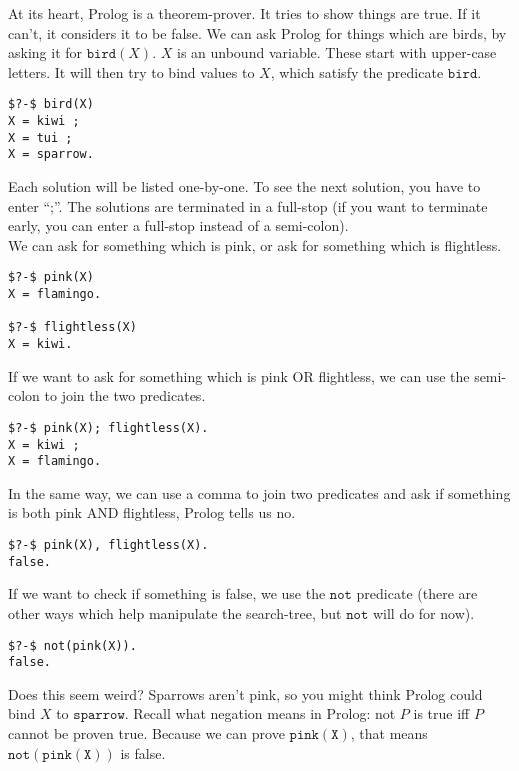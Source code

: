 \documentclass[a4paper,12pt]{article}
\newcommand{\kwa}[1]{\mathtt{#1}}
\begin{document}
\noindent
At its heart, Prolog is a theorem-prover. It tries to show things are true. If it can't, it considers it to be false. We can ask Prolog for things which are birds, by asking it for $\kwa{bird}(X)$. $X$ is an unbound variable. These start with upper-case letters. It will then try to bind values to $X$, which satisfy the predicate $\kwa{bird}$.

\begin{lstlisting}
$?-$ bird(X)
X = kiwi ;
X = tui ;
X = sparrow.
\end{lstlisting}

\noindent
Each solution will be listed one-by-one. To see the next solution, you have to enter ``;''. The solutions are terminated in a full-stop (if you want to terminate early, you can enter a full-stop instead of a semi-colon). \\

\noindent
We can ask for something which is pink, or ask for something which is flightless.
\begin{lstlisting}
$?-$ pink(X)
X = flamingo.

$?-$ flightless(X)
X = kiwi.
\end{lstlisting}

\noindent
If we want to ask for something which is pink OR flightless, we can use the semi-colon to join the two predicates.

\begin{lstlisting}
$?-$ pink(X); flightless(X).
X = kiwi ;
X = flamingo.
\end{lstlisting}

\noindent
In the same way, we can use a comma to join two predicates and ask if something is both pink AND flightless, Prolog tells us no.

\begin{lstlisting}
$?-$ pink(X), flightless(X).
false.
\end{lstlisting}

\noindent
If we want to check if something is false, we use the $\kwa{not}$ predicate (there are other ways which help manipulate the search-tree, but $\kwa{not}$ will do for now).

\begin{lstlisting}
$?-$ not(pink(X)).
false.
\end{lstlisting}

\noindent
Does this seem weird? Sparrows aren't pink, so you might think Prolog could bind $X$ to $\kwa{sparrow}$. Recall what negation means in Prolog: not $P$ is true iff $P$ cannot be proven true. Because we can prove $\kwa{pink(X)}$, that means $\kwa{not(pink(X))}$ is false.
\end{document}
